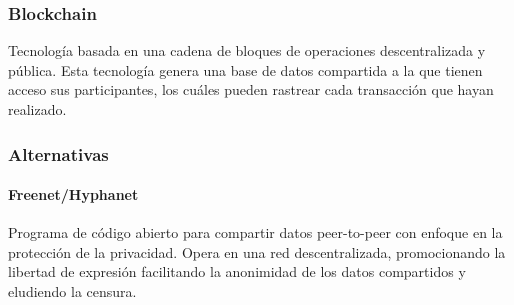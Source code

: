 \subsubsection{Blockchain}
Tecnología basada en una cadena de bloques de operaciones descentralizada y pública.  Esta tecnología genera una base de datos compartida a la que tienen acceso sus participantes, los cuáles pueden rastrear cada transacción que hayan realizado.\parencite{blockchain}




\subsubsection{Alternativas}
\paragraph{Freenet/Hyphanet}
Programa de código abierto para compartir datos peer-to-peer con enfoque en la protección de la privacidad. Opera en una red descentralizada, promocionando la libertad de expresión facilitando la anonimidad de los datos compartidos y eludiendo la censura.\cite{freenet}\cite{hyphanet}
